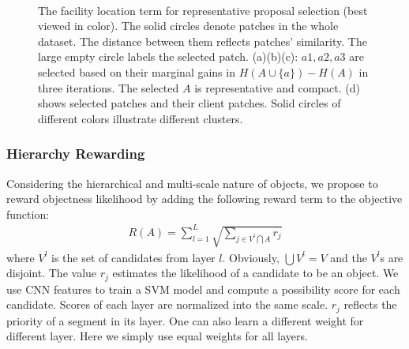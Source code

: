 \documentclass[10pt,twocolumn,letterpaper]{article}
\begin{document}
\begin{figure}
\begin{center}
\\
\end{center}
\caption{The facility location term for representative proposal selection (best viewed in color). The solid circles denote patches in the whole dataset. The distance between them reflects patches' similarity. The large empty circle labels the selected patch. (a)(b)(c): $a1, a2, a3$ are selected based on their marginal gains in $H(A\cup \{a\})-H(A)$ in three iterations. The selected $A$ is representative and compact. (d) shows selected patches and their client patches. Solid circles of different colors illustrate different clusters.}
\label{fig:fl}
\end{figure}


\subsubsection{Hierarchy Rewarding}
Considering the hierarchical and multi-scale nature of objects, we propose to reward objectness likelihood by adding the following reward term to the objective function:
\begin{eqnarray}
\label{eqn:reward}
R(A)=\sum_{l=1}^L\sqrt{\sum_{j\in V^l \bigcap A}r_j}
\end{eqnarray}
where $V^l$ is the set of candidates from layer $l$. Obviously, $\bigcup V^l=V$ and the $V^l$s are disjoint. The value $r_j$ estimates the likelihood of a candidate to be an object. We use CNN features to train a SVM model and compute a possibility score for each candidate. Scores of each layer are normalized into the same scale. $r_j$ reflects the priority of a segment in its layer. One can also learn a different weight for different layer. Here we simply use equal weights for all layers.
\end{document}
